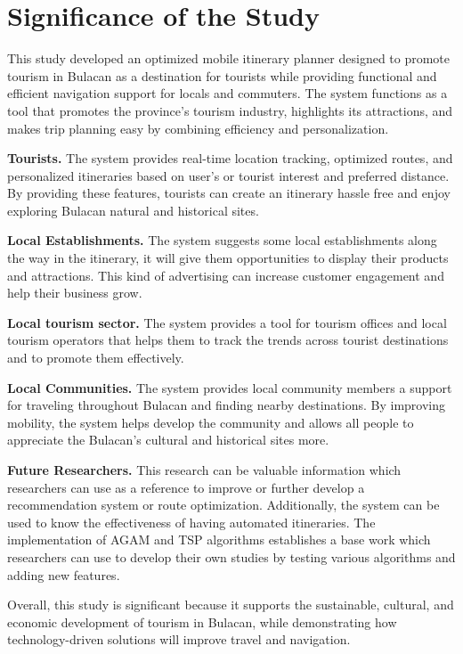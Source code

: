 \section{Significance of the Study}
This study developed an optimized mobile itinerary planner designed to promote tourism in Bulacan as a destination for tourists while providing functional and efficient navigation support for locals and commuters. The system functions as a tool that promotes the province’s tourism industry, highlights its attractions, and makes trip planning easy by combining efficiency and personalization.

\textbf{Tourists.} The system provides real-time location tracking, optimized routes, and personalized itineraries based on user’s or tourist interest and preferred distance. By providing these features, tourists can create an itinerary hassle free and enjoy exploring Bulacan natural and historical sites.

\textbf{Local Establishments.} The system suggests some local establishments along the way in the itinerary, it will give them opportunities to display their products and attractions. This kind of advertising can increase customer engagement and help their business grow.

\textbf{Local tourism sector.} The system provides a tool for  tourism offices and local tourism operators that helps them to track the trends across tourist destinations and to promote them effectively.

\textbf{Local Communities.} The system provides local community members a support  for traveling throughout Bulacan and finding nearby destinations. By improving mobility, the system helps develop the community and allows all people to appreciate the Bulacan’s cultural and historical sites more.

\textbf{Future Researchers.} This research can be valuable information which researchers can use as a reference to improve or further develop a recommendation system or route optimization. Additionally, the system can be used  to know the effectiveness of having automated itineraries. The implementation of AGAM and TSP algorithms establishes a base work which researchers can use to develop their own studies by testing various algorithms and adding new features.

Overall, this study is significant because it supports the sustainable, cultural, and economic development of tourism in Bulacan, while demonstrating how technology-driven solutions will improve travel and navigation.


